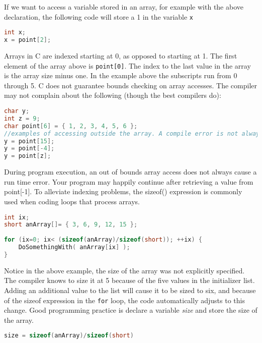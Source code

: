 If we want to access a variable stored in an array, for example with the above
declaration, the following code will store a 1 in the variable \texttt{x}
\lstset{basicstyle=\scriptsize, numbers=left, captionpos=b, tabsize=4}
\begin{lstlisting}[caption=Section \thesection listing \arabic{arraycnt},language={C},
breaklines=true,xleftmargin=15pt,label=lst:section\thesection listing\arabic{arraycnt}]
int x;
x = point[2];
\end{lstlisting}

Arrays in C are indexed starting at 0, as opposed to starting at 1. The first
element of the array above is \texttt{point[0]}. The index to the last value in
the array is the array size minus one.  In the example above the subscripts run
from 0 through 5. C does not guarantee bounds checking on array accesses. The
compiler may not complain about the following (though the best compilers do):
\lstset{basicstyle=\scriptsize, numbers=left, captionpos=b, tabsize=4}
\begin{lstlisting}[caption=Section \thesection listing \arabic{arraycnt},language={C},
breaklines=true,xleftmargin=15pt,label=lst:section\thesection listing\arabic{arraycnt}]
char y;
int z = 9;
char point[6] = { 1, 2, 3, 4, 5, 6 };
//examples of accessing outside the array. A compile error is not always raised
y = point[15];
y = point[-4];
y = point[z];
\end{lstlisting}

During program execution, an out of bounds array access does not always cause a
run time error. Your program may happily continue after retrieving a value from
point[-1]. To alleviate indexing problems, the sizeof() expression is commonly
used when coding loops that process arrays.
\lstset{basicstyle=\scriptsize, numbers=left, captionpos=b, tabsize=4}
\begin{lstlisting}[caption=Section \thesection listing \arabic{arraycnt},language={C},
breaklines=true,xleftmargin=15pt,label=lst:section\thesection listing\arabic{arraycnt}]
int ix;
short anArray[]= { 3, 6, 9, 12, 15 };
 
for (ix=0; ix< (sizeof(anArray)/sizeof(short)); ++ix) {
	DoSomethingWith( anArray[ix] );
}
\end{lstlisting}

Notice in the above example, the size of the array was not explicitly
specified. The compiler knows to size it at 5 because of the five values in the
initializer list. Adding an additional value to the list will cause it to be
sized to six, and because of the sizeof expression in the \texttt{for} loop,
the code automatically adjusts to this change. Good programming practice is
declare a variable \emph{size } and store the size of the array.
\lstset{basicstyle=\scriptsize, numbers=left, captionpos=b, tabsize=4}
\begin{lstlisting}[caption=Section \thesection listing \arabic{arraycnt},language={C},
breaklines=true,xleftmargin=15pt,label=lst:section\thesection listing\arabic{arraycnt}]
size = sizeof(anArray)/sizeof(short)
\end{lstlisting}

